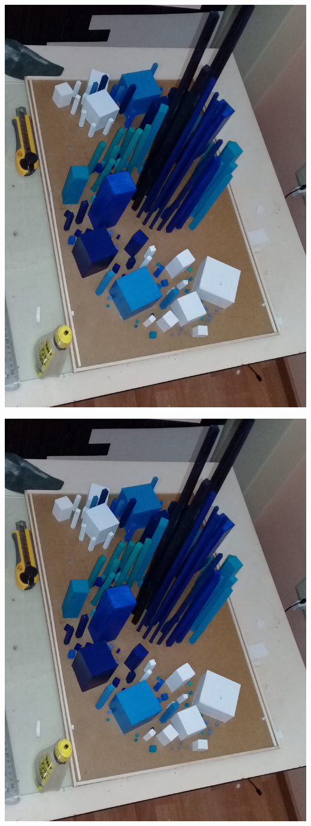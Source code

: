 \documentclass[12pt,]{report}
\begin{document}
\includegraphics{r5.jpg}

\includegraphics{r5.jpg}
\end{document}
